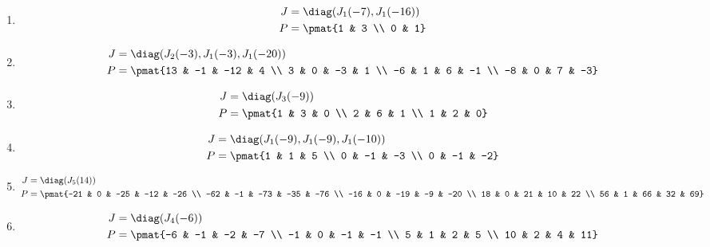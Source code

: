 \begin{enumerate}
\item

\begin{align*}
J &= \diag(J_{1}(-7), J_{1}(-16))\\
P &= \pmat{1 & 3 \\ 0 & 1}
\end{align*}

\item

\begin{align*}
J &= \diag(J_{2}(-3), J_{1}(-3), J_{1}(-20))\\
P &= \pmat{13 & -1 & -12 & 4 \\ 3 & 0 & -3 & 1 \\ -6 & 1 & 6 & -1 \\ -8 & 0 & 7 & -3}
\end{align*}

\item

\begin{align*}
J &= \diag(J_{3}(-9))\\
P &= \pmat{1 & 3 & 0 \\ 2 & 6 & 1 \\ 1 & 2 & 0}
\end{align*}

\item

\begin{align*}
J &= \diag(J_{1}(-9), J_{1}(-9), J_{1}(-10))\\
P &= \pmat{1 & 1 & 5 \\ 0 & -1 & -3 \\ 0 & -1 & -2}
\end{align*}

\item

\begin{align*}
J &= \diag(J_{5}(14))\\
P &= \pmat{-21 & 0 & -25 & -12 & -26 \\ -62 & -1 & -73 & -35 & -76 \\ -16 & 0 & -19 & -9 & -20 \\ 18 & 0 & 21 & 10 & 22 \\ 56 & 1 & 66 & 32 & 69}
\end{align*}

\item

\begin{align*}
J &= \diag(J_{4}(-6))\\
P &= \pmat{-6 & -1 & -2 & -7 \\ -1 & 0 & -1 & -1 \\ 5 & 1 & 2 & 5 \\ 10 & 2 & 4 & 11}
\end{align*}


\end{enumerate}
